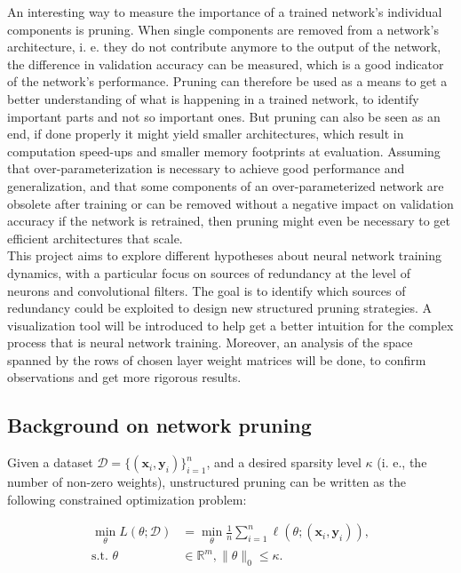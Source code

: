 An interesting way to measure the importance of a trained network's individual components is pruning. When single components are removed from a network's architecture, i. e. they do not contribute anymore to the output of the network, the difference in validation accuracy can be measured, which is a good indicator of the network's performance. Pruning can therefore be used as a means to get a better understanding of what is happening in a trained network, to identify important parts and not so important ones. But pruning can also be seen as an end, if done properly it might yield smaller architectures, which result in computation speed-ups and smaller memory footprints at evaluation. Assuming that over-parameterization is necessary to achieve good performance and generalization, and that some components of an over-parameterized network are obsolete after training or can be removed without a negative impact on validation accuracy if the network is retrained, then pruning might even be necessary to get efficient architectures that scale. \\

This project aims to explore different hypotheses about neural network training dynamics, with a particular focus on sources of redundancy at the level of neurons and convolutional filters. The goal is to identify which sources of redundancy could be exploited to design new structured pruning strategies. A visualization tool will be introduced to help get a better intuition for the complex process that is neural network training. Moreover, an analysis of the space spanned by the rows of chosen layer weight matrices will be done, to confirm observations and get more rigorous results.

\subsection*{Background on network pruning}

Given a dataset $\mathcal{D} = \{(\mathbf{x}_i, \mathbf{y}_i)\}_{i=1}^{n}$, and a desired sparsity level $\kappa$ (i. e., the number of non-zero weights), unstructured pruning can be written as the following constrained optimization problem:

\begin{align*}
\min_{\theta}L(\theta; \mathcal{D}) &= \min_{\theta} \frac{1}{n} \sum\limits_{i=1}^n \ell (\theta; (\mathbf{x}_i, \mathbf{y}_i)), \\
\text{s.t. } \theta &\in \mathbb{R}^m, \|\theta\|_0 \leq \kappa.
\end{align*}

